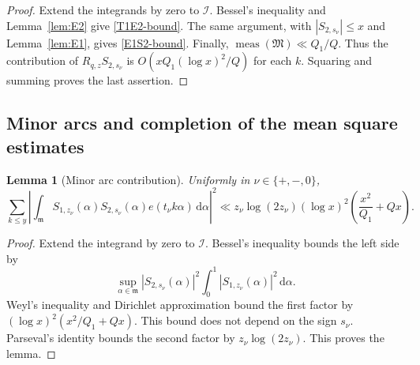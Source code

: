 \documentclass[12pt,reqno]{amsart}
\numberwithin{equation}{section}
\theoremstyle{plain}
\newtheorem{lemma}[theorem]{Lemma}
\theoremstyle{remark}
\newcommand{\dif}{\mathrm{d}}
\newcommand{\majorarc}{\mathfrak{M}}
\newcommand{\minorarc}{\mathfrak{m}}
\begin{document}
\begin{proof}
Extend the integrands by zero to $\mathcal I$.
Bessel's inequality and Lemma~\ref{lem:E2} give \eqref{T1E2-bound}.
The same argument, with $|S_{2,s_\nu}|\leq x$ and
Lemma~\ref{lem:E1}, gives \eqref{E1S2-bound}.
Finally, $\operatorname{meas}(\majorarc)\ll Q_1/Q$.
Thus the contribution of $R_{q,z}S_{2,s_\nu}$ is
$O(xQ_1(\log x)^2/Q)$ for each $k$.
Squaring and summing proves the last assertion.
\end{proof}

\subsection{Minor arcs and completion of the mean square estimates}

\begin{lemma}[Minor arc contribution]\label{lem:minor-arcs}
Uniformly in $\nu\in\{+,-,0\}$,
\begin{equation}
\sum_{k\leq y}\left|\int_{\minorarc}
 S_{1,z_\nu}(\alpha)S_{2,s_\nu}(\alpha)e(t_\nu k\alpha)
 \,\dif\alpha\right|^2
\ll z_\nu\log(2z_\nu)(\log x)^2
 \left(\frac{x^2}{Q_1}+Qx\right).              \label{minor-error-general}
\end{equation}
\end{lemma}

\begin{proof}
Extend the integrand by zero to $\mathcal I$.
Bessel's inequality bounds the left side by
\[
 \sup_{\alpha\in\minorarc}|S_{2,s_\nu}(\alpha)|^2
 \int_0^1|S_{1,z_\nu}(\alpha)|^2\,\dif\alpha.
\]
Weyl's inequality and Dirichlet approximation bound the first factor
by $(\log x)^2(x^2/Q_1+Qx)$.
This bound does not depend on the sign $s_\nu$.
Parseval's identity bounds the second factor by $z_\nu\log(2z_\nu)$.
This proves the lemma.
\end{proof}
\end{document}
